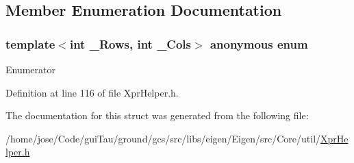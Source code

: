 \subsection{Member Enumeration Documentation}
\hypertarget{structei__size__at__compile__time_a0ace67db87575423352043f1c3c5719e}{\subsubsection[{anonymous enum}]{\setlength{\rightskip}{0pt plus 5cm}template$<$int \-\_\-\-Rows, int \-\_\-\-Cols$>$ anonymous enum}}\label{structei__size__at__compile__time_a0ace67db87575423352043f1c3c5719e}
\begin{Desc}
\item[Enumerator]\par
\begin{description}
\item[{\em 
\hypertarget{structei__size__at__compile__time_a0ace67db87575423352043f1c3c5719eabe30e73d04e66ca2c7d5ddfddb2d0a27}{ret}\label{structei__size__at__compile__time_a0ace67db87575423352043f1c3c5719eabe30e73d04e66ca2c7d5ddfddb2d0a27}
}]\end{description}
\end{Desc}


Definition at line 116 of file Xpr\-Helper.\-h.



The documentation for this struct was generated from the following file\-:\begin{DoxyCompactItemize}
\item 
/home/jose/\-Code/gui\-Tau/ground/gcs/src/libs/eigen/\-Eigen/src/\-Core/util/\hyperlink{_xpr_helper_8h}{Xpr\-Helper.\-h}\end{DoxyCompactItemize}
